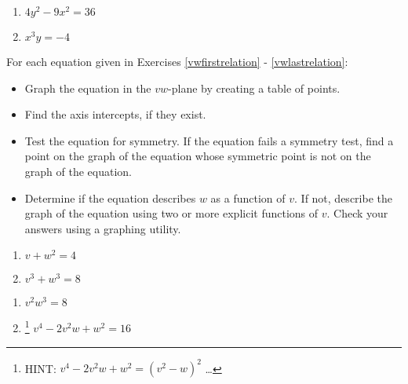 \documentclass{ximera}
\begin{document}
\begin{multicols}{2}
\begin{enumerate}
\setcounter{enumi}{\value{HW}}

\item  $4y^2 - 9x^2 = 36$
\item $x^{3}y = -4$  \label{oldonethreelast}

\setcounter{HW}{\value{enumi}}
\end{enumerate}
\end{multicols}




\pagebreak

For each equation given in Exercises \ref{vwfirstrelation} - \ref{vwlastrelation}:

\begin{itemize}

\item   Graph the equation in the $vw$-plane by creating a table of points. 

\item  Find the axis intercepts, if they exist.

\item  Test the equation for symmetry.  If the equation fails a symmetry test, find a point on the graph of the equation whose symmetric point is not on the graph of the equation.

\item  Determine if the equation describes $w$ as a function of $v$.  If not, describe the graph of the equation using two or more explicit functions of $v$.  Check your answers using a graphing utility.


\end{itemize}


\begin{multicols}{2}
\begin{enumerate}
\setcounter{enumi}{\value{HW}}

\item  $v+w^2 = 4$   \label{vwfirstrelation}
\item $v^{3}+w^3 =8$ 

\setcounter{HW}{\value{enumi}}
\end{enumerate}
\end{multicols}


\begin{multicols}{2}
\begin{enumerate}
\setcounter{enumi}{\value{HW}}

\item  $v^2w^3 = 8$
\item \hspace{-.1in}\footnote{HINT: $v^4 - 2v^2 w + w^2 = \left(v^2 - w \right)^2$ \ldots} $v^4 - 2v^2 w + w^2 = 16$  \label{vwlastrelation}

\setcounter{HW}{\value{enumi}}
\end{enumerate}
\end{multicols}
\end{document}
